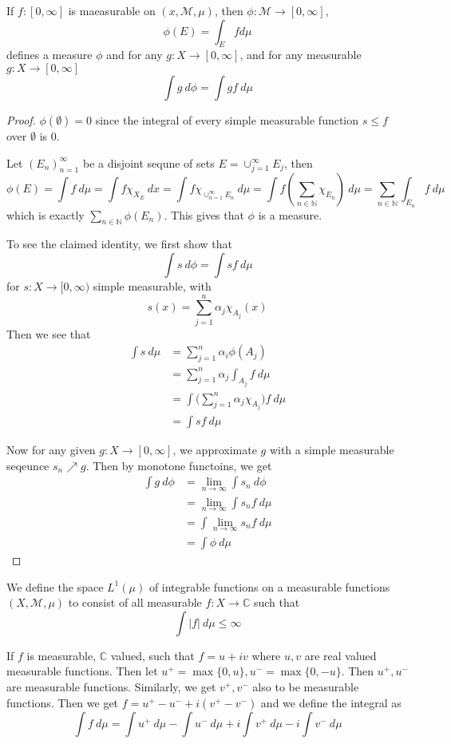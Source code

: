\begin{theorem}
  If $f: [0, \infty]$ is maeasurable on $(x, \mathcal{M}, \mu)$, then $\phi: \mathcal{M} \to [0, \infty]$, \[
    \phi(E) = \int_E f d \mu
  \]
   defines a measure $\phi$ and for any $g: X \to [0, \infty]$, and for any measurable $g: X \to [0, \infty]$ \[
         \int g \ d \phi = \int g f \ d \mu
   \]
\end{theorem}
\begin{proof}
  $\phi(\emptyset) = 0$ since the integral of every simple measurable function $s \le f$ over $\emptyset$ is 0. 

  Let $(E_n)_{ n =1}^\infty$ be a disjoint sequne of sets $E = \cup_{j = 1}^{\infty}E_j$, then \[
    \phi(E) = \int f  \ d \mu = \int f \chi_{X_E} \ dx = \int f \chi_{\cup_{n = 1}^{\infty}E_n} \ d \mu = \int f (\sum_{n \in \mathbb{N}} \chi_{E_n}) \ d \mu =\sum_{n \in \mathbb{N}} \int_{E_n} f \ d \mu
  \]
  which is exactly $\sum_{n \in \mathbb{N}} \phi(E_n)$. This gives that $\phi$ is a measure.

  To see the claimed identity, we first show that \[
       \int s \ d \phi = \int sf \ d \mu
  \]
  for $s: X \to [0, \infty)$ simple measurable, with \[
    s(x) = \sum_{j = 1}^{n} \alpha_j \chi_{A_j}(x)
  \]
  Then we see that \begin{align*}
    \int s \ d \mu &= \sum_{j = 1}^{n} \alpha_i \phi(A_j) \\ 
    &= \sum_{j = 1}^{n} \alpha_j \int_{A_j} f \ d \mu \\ 
    &= \int \Big( \sum_{j = 1}^{n} \alpha_j \chi_{A_j}\Big) f \ d \mu \\ 
    & = \int sf \ d \mu
  \end{align*}

  Now for any given $g: X \to [0, \infty]$, we approximate $g$ with a simple measurable seqeunce $s_n \nearrow g$. Then by monotone functoins, we get \begin{align*}
    \int g \ d \phi & = \lim_{n \to \infty} \int s_n \ d \phi \\ 
    &= \lim_{n \to \infty} \int s_n f \ d \mu \\ 
    &= \int \lim_{n \to \infty} s_n f \ d \mu \\ 
    &=  \int \phi \ d \mu
  \end{align*}
\end{proof}

\begin{definition}
  We define the space $L^1(\mu)$ of integrable functions on a measurable functions $(X, \mathcal{M},  \mu)$ to consist of all measurable $f: X \to \mathbb{C}$ such that \[
       \int |f| \ d \mu \le \infty
  \]
\end{definition}
\begin{remark}
  If $f$ is measurable, $\mathbb{C}$ valued, such that $f = u + iv$ where $u, v$ are real valued measurable functions. Then let $u^+ = \max \{ 0, u \}, u^- = \max \{ 0, -u \}$. Then $u^+, u^-$ are measurable functions. Similarly, we get $v^+, v^-$ also to be measurable functions. Then we get $f = u^+ - u^- + i(v^+ - v^-)$ and we define the integral as \[
        \int  f \ d \mu = \int u^+ \ d \mu - \int  u^- \ d \mu + i \int  v^+ \ d \mu - i \int  v^- \ d \mu
  \]
\end{remark}
